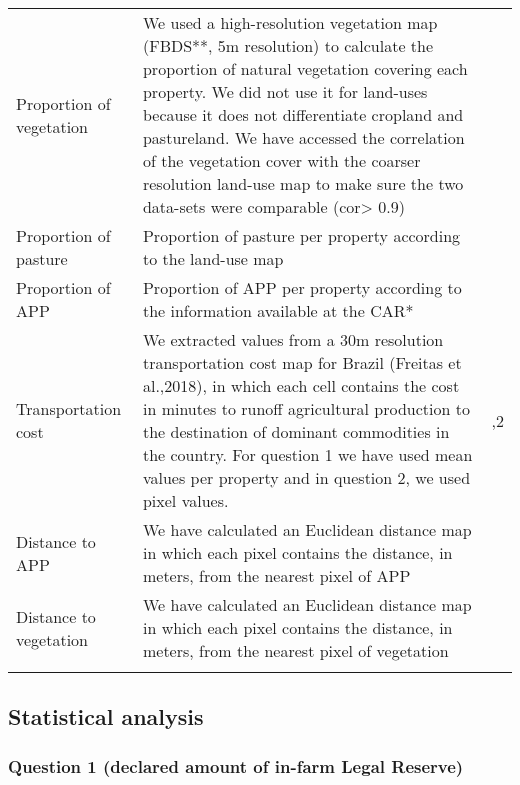 \documentclass[
	12pt,				%
	oneside,			%
	a4paper,			%
	chapter=TITLE,		%
	section=TITLE,		%
	brazil,			%
	english				%
	]{abntex2}
\begin{document}
\begin{longtable}[t]{>{\raggedright\arraybackslash}p{2.5cm}>{\raggedright\arraybackslash}p{7cm}>{\raggedright\arraybackslash}p{2cm}}
\addlinespace
Proportion of vegetation & We used a high-resolution vegetation map (FBDS**, 5m resolution) to calculate the proportion of natural vegetation covering each property. We did not use it for land-uses because it does not differentiate cropland and pastureland. We have accessed the correlation of the vegetation cover with the coarser resolution land-use map to make sure the two data-sets were comparable (cor> 0.9) & 1\\
Proportion of pasture & Proportion of pasture per property according to the land-use map & 1\\
Proportion of APP & Proportion of APP per property according to the information available at the CAR* & 1\\
Transportation cost & We extracted values from a  30m resolution transportation cost map for Brazil (Freitas et al.,2018), in which each cell contains the cost in minutes to runoff agricultural production to the destination of dominant commodities in the country. For question 1 we have used mean values per property and in question 2, we used pixel values. & 1,2\\
Distance to APP & We have calculated an Euclidean distance map in which each pixel contains the distance, in meters, from the nearest pixel of APP & 2\\
\addlinespace
Distance to vegetation & We have calculated an Euclidean distance map in which each pixel contains the distance, in meters, from the nearest pixel of vegetation & 2\\*
\end{longtable}
\hypertarget{statistical-analysis}{%
\subsection{Statistical analysis}\label{statistical-analysis}}

\hypertarget{question-1-declared-amount-of-in-farm-legal-reserve}{%
\subsubsection{Question 1 (declared amount of in-farm Legal Reserve)}\label{question-1-declared-amount-of-in-farm-legal-reserve}}
\end{document}
